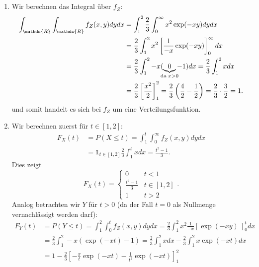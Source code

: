 \documentclass[a4paper]{article}
\begin{document}
\subsection{}

\begin{enumerate}
    \item Wir berechnen das Integral über $f_Z$:
    \begin{align*}
        \int_\mathds{R} \int_\mathds{R} f_Z(x,y) dy dx &= \int_1^2 \frac{2}{3} \int_{0}^{\infty}  x^2 \exp(-xy) dy dx\\
        &= \frac{2}{3} \int_{1}^{2} x^2 \left[ \frac{1}{-x} \exp(-xy) \right]_0^\infty dx\\
        &= \frac{2}{3} \int_{1}^{2} - x (\underbrace{0}_{\mathclap{\text{da }x>0}} - 1) dx = \frac{2}{3} \int_{1}^{2} x dx \\
        &= \frac{2}{3} \left[\frac{x^2}{2}\right]_1^2 = \frac{2}{3} \left(\frac{4}{2} - \frac{1}{2}\right) = \frac{2}{3} \cdot \frac{3}{2} = 1\text{.}
    \end{align*}
    und somit handelt es sich bei $f_Z$ um eine Verteilungsfunktion.
    \item Wir berechnen zuerst für $t \in [1,2]$:
    \begin{align*}
        F_X(t) &= P(X \leq t) = \int_1^t \int_{0}^{\infty} f_Z(x,y) dy dx \\
        &= \mathds{1}_{t \in [1,2]} \frac{2}{3} \int_{1}^{t} x dx = \frac{t^2 - 1}{3}\text{.}
    \end{align*}
    Dies zeigt
    \begin{equation*}
        F_X(t) = \left\{ \begin{matrix}
            0 & t < 1\\ \frac{t^2 - 1}{3} & t \in [1,2] \\ 1 & t > 2
        \end{matrix} \right. \text{.}
    \end{equation*}
    Analog betrachten wir $Y$ für $t > 0$ (da der Fall $t = 0$ als Nullmenge vernachlässigt werden darf):
    \begin{align*}
        F_Y(t) &= P(Y \leq t) = \int_{1}^{2} \int_{0}^{t} f_Z(x,y) dy dx = \frac{2}{3} \int_{1}^{2} x^2 \frac{1}{-x} \left[ \exp(-xy) \ \right]_0^t dx \\
        &= \frac{2}{3} \int_{1}^{2} - x \left( \exp(-xt) - 1 \right) = \frac{2}{3} \int_1^2 x dx - \frac{2}{3} \int_1^2 x \exp(-x t) dx \\
        &= 1 - \frac{2}{3} \left[ - \frac{x}{t} \exp(-xt) - \frac{1}{t^2} \exp(-xt) \right]_1^2 \\

\end{align*}
\end{enumerate}
\end{document}
